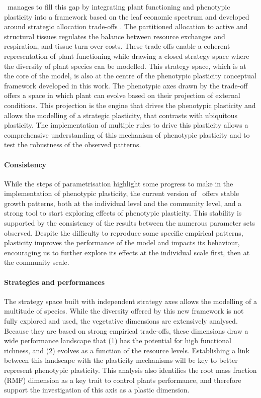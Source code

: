 \model ~manages to fill this gap by integrating plant functioning and phenotypic plasticity into a framework based on the leaf economic spectrum \cite{wright_worldwide_2004} and developed around strategic allocation trade-offs \cite{grime_evidence_1977, reineking_2006}. The partitioned allocation to active and structural tissues regulates the balance between resource exchanges and respiration, and tissue turn-over costs. These trade-offs enable a coherent representation of plant functioning while drawing a closed strategy space where the diversity of plant species can be modelled. This strategy space, which is at the core of the model, is also at the centre of the phenotypic plasticity conceptual framework developed in this work. The phenotypic axes drawn by the trade-off offers a space in which plant can evolve based on their projection of external conditions. This projection is the engine that drives the phenotypic plasticity and allows the modelling of a strategic plasticity, that contrasts with ubiquitous plasticity. The implementation of multiple rules to drive this plasticity allows a comprehensive understanding of this mechanism of phenotypic plasticity and to test the robustness of the observed patterns.


\paragraph{Consistency}

While the steps of parametrisation highlight some progress to make in the implementation of phenotypic plasticity, the current version of \model ~offers stable growth patterns, both at the individual level and the community level, and a strong tool to start exploring effects of phenotypic plasticity. This stability is supported by the consistency of the results between the numerous parameter sets observed. Despite the difficulty to reproduce some specific empirical patterns, plasticity improves the performance of the model and impacts its behaviour, encouraging us to further explore its effects at the individual scale first, then at the community scale.

\paragraph{Strategies and performances}

The strategy space built with independent strategy axes allows the modelling of a multitude of species. While the diversity offered by this new framework is not fully explored and used, the vegetative dimensions are extensively analysed. Because they are based on strong empirical trade-offs, these dimensions draw a wide performance landscape that (1) has the potential for high functional richness, and (2) evolves as a function of the resource levels. Establishing a link between this landscape with the plasticity mechanisms will be key to better represent phenotypic plasticity. This analysis also identifies the root mass fraction (RMF) dimension as a key trait to control plants performance, and therefore support the investigation of this axis as a plastic dimension.


